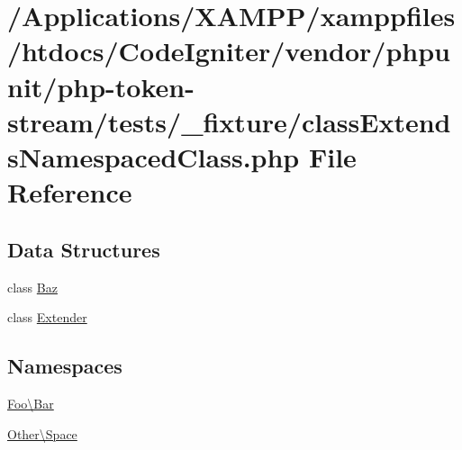 \hypertarget{class_extends_namespaced_class_8php}{}\section{/\+Applications/\+X\+A\+M\+P\+P/xamppfiles/htdocs/\+Code\+Igniter/vendor/phpunit/php-\/token-\/stream/tests/\+\_\+fixture/class\+Extends\+Namespaced\+Class.php File Reference}
\label{class_extends_namespaced_class_8php}
\subsection*{Data Structures}
\begin{DoxyCompactItemize}
\item 
class \mbox{\hyperlink{class_foo_1_1_bar_1_1_baz}{Baz}}
\item 
class \mbox{\hyperlink{class_other_1_1_space_1_1_extender}{Extender}}
\end{DoxyCompactItemize}
\subsection*{Namespaces}
\begin{DoxyCompactItemize}
\item 
 \mbox{\hyperlink{namespace_foo_1_1_bar}{Foo\textbackslash{}\+Bar}}
\item 
 \mbox{\hyperlink{namespace_other_1_1_space}{Other\textbackslash{}\+Space}}
\end{DoxyCompactItemize}
